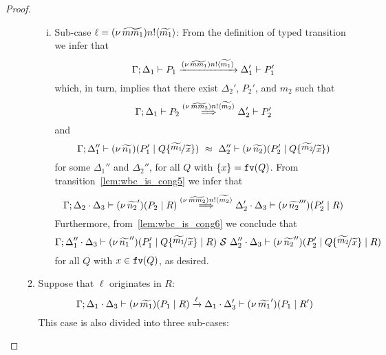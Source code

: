 \begin{proof}
\begin{enumerate}[I.]
\begin{enumerate}[1.]
\begin{enumerate}[i.]
					\item	Sub-case $\ell = (\nu\, \widetilde{mm_1}) n ! \langle \widetilde{m_1} \rangle$:
 From the definition of typed transition we infer that
							\[
								\Gamma; \Delta_1 \vdash P_1 \xrightarrow{(\nu\, \widetilde{mm_1}) n ! \langle \widetilde{m_1} \rangle} \Delta_1' \vdash P_1'
							\]
							which, in turn, implies that there exist $\Delta_2'$, $P_2'$, and $m_2$ such that
							\begin{equation}
							\Gamma; \Delta_1 \vdash P_2 \stackrel{(\nu\, \widetilde{mm_2}) n ! \langle \widetilde{m_2} \rangle}{\Longrightarrow} \Delta_2' \vdash P_2'
								\label{lem:wbc_is_cong5}
								\end{equation}
								and
								\begin{equation}
							\horel{\Gamma}{\Delta_1''}{\newsp{\widetilde{n_1}}{P_1' \Par Q \subst{\widetilde{m_1}}{\widetilde{x}}}}
								{\ \wbc\ }
								{\Delta_2''}{\newsp{\widetilde{n_2}}{P_2' \Par Q \subst{\widetilde{m_2}}{\widetilde{x}}}}
								\label{lem:wbc_is_cong6}
							\end{equation}
						 for some $\Delta_1''$ and $\Delta_2''$, 
						 for all $Q$ with $\{x\} = \mathtt{fv}(Q)$.
						\noi From transition~\eqref{lem:wbc_is_cong5} we infer that 
						\[
							\Gamma; \Delta_2 \cdot \Delta_3 \vdash (\nu\, \widetilde{n_2}')(P_2 \;|\; R) \stackrel{(\nu\, \widetilde{mm_2}) n ! \langle \widetilde{m_2} \rangle}{\Longrightarrow} \Delta_2' \cdot \Delta_3 \vdash (\nu\, \widetilde{n_2}''')(P_2' \;|\; R)
						\]
						\noi Furthermore, from~\eqref{lem:wbc_is_cong6} we conclude that 
						\[
							\horel{\Gamma}{\Delta_1'' \cat \Delta_3}{\newsp{\widetilde{n_1}''}{P_1' \Par Q \subst{\widetilde{m_1}}{\widetilde{x}} \Par R}}
							{\ \mathcal{S}\ }
							{\Delta_2'' \cat \Delta_3}{\newsp{\widetilde{n_2}''}{P_2' \Par Q \subst{\widetilde{m_2}}{\widetilde{x}} \Par R}}
						\]
					for all $Q$ with $x \in \mathtt{fv}(Q)$, as desired.
				\end{enumerate}

		\item Suppose that $\ell$ originates in $R$:
				\[
					\Gamma; \Delta_1 \cdot \Delta_3 \vdash (\nu\, \widetilde{m_1})(P_1 \;|\; R) \xrightarrow{\ell} \Delta_1 \cdot \Delta_3' \vdash (\nu\, \widetilde{m_1}')(P_1 \;|\; R')
				\]
				\noi This case is also divided into three sub-cases:


\end{enumerate}
\end{enumerate}
\end{proof}
